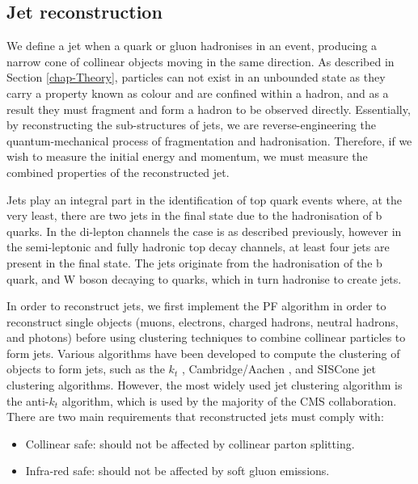 \subsection{Jet reconstruction} \label{subsec-JetReconstruction}

We define a jet when a quark or gluon hadronises in an event, producing a narrow cone of collinear objects moving in the same direction. As described in Section \ref{chap-Theory}, particles can not exist in an unbounded state as they carry a property known as colour and are confined within a hadron, and as a result they must fragment and form a hadron to be observed directly. Essentially, by reconstructing the sub-structures of jets, we are reverse-engineering the quantum-mechanical process of fragmentation and hadronisation. Therefore, if we wish to measure the initial energy and momentum, we must measure the combined properties of the reconstructed jet. 

Jets play an integral part in the identification of top quark events where, at the very least, there are two jets in the final state due to the hadronisation of b quarks. In the di-lepton channels the case is as described previously, however in the semi-leptonic and fully hadronic top decay channels, at least four jets are present in the final state. The jets originate from the hadronisation of the b quark, and W boson decaying to quarks, which in turn hadronise to create jets.  

In order to reconstruct jets, we first implement the PF algorithm in order to reconstruct single objects (muons, electrons, charged hadrons, neutral hadrons, and photons) before using clustering techniques to combine collinear particles to form jets. Various algorithms have been developed to compute the clustering of objects to form jets, such as the $k_t$ \cite{Ellis:1993tq}, Cambridge/Aachen \cite{Dokshitzer:1997in}, and SISCone \cite{Blazey:2000qt} jet clustering algorithms. However, the most widely used jet clustering algorithm is the anti-$k_t$ \cite{Cacciari:2008gp} algorithm, which is used by the majority of the CMS collaboration. There are two main requirements that reconstructed jets must comply with:

\begin{itemize}
	\item Collinear safe: should not be affected by collinear parton splitting.
	\item Infra-red safe: should not be affected by soft gluon emissions.
\end{itemize}

